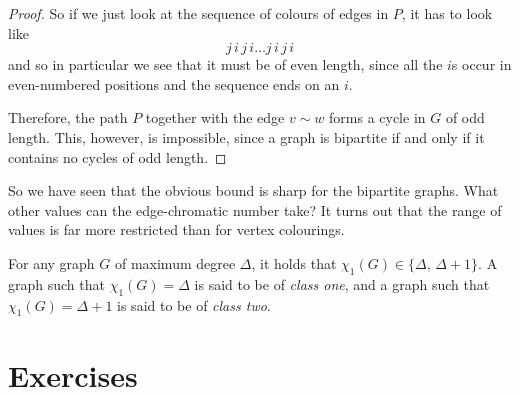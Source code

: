 \documentclass[nobib]{tufte-handout}
\begin{document}
\begin{theorem}
\begin{proof}
        So if we just look at the sequence of colours of edges in $P$, it has to look like
        $$j\,i\,j\,i\ldots j\,i\,j\,i$$
        and so in particular we see that it must be of even length, since all the $i$s occur in even-numbered positions and the sequence ends on an $i$.

        Therefore, the path $P$ together with the edge $v \sim w$ forms a cycle in $G$ of odd length. This, however, is impossible, since a graph is bipartite if and only if it contains no cycles of odd length.
    \end{proof}
\end{theorem}

So we have seen that the obvious bound is sharp for the bipartite graphs. What other values can the edge-chromatic number take? It turns out that the range of values is far more restricted than for vertex colourings.

\begin{theorem}[Vizing, 1964]
  For any graph $G$ of maximum degree $\Delta$, it holds that $\chi_1(G) \in \{\Delta,\, \Delta+1\}$. A graph such that $\chi_1(G) = \Delta$ is said to be of \emph{class one}, and a graph such that $\chi_1(G) = \Delta + 1$ is said to be of \emph{class two}.
\end{theorem}

\section{Exercises}


%
%
\end{document}
